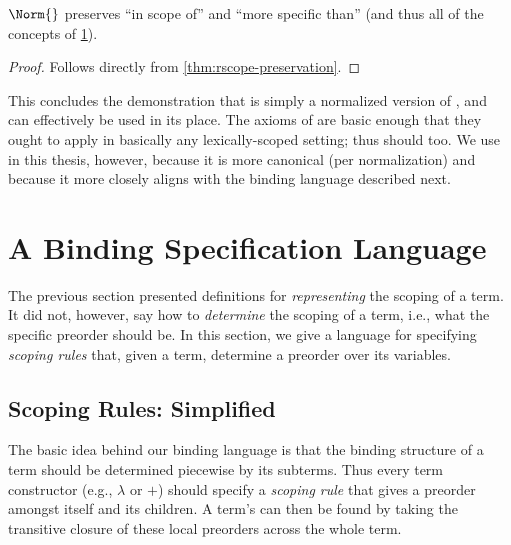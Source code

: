 \begin{lemma}
  $\Norm{}$ preserves ``in scope of'' and ``more specific than''
  (and thus all of the concepts of \cref{sec:rscope-rules}).
\end{lemma}
\begin{proof}
  Follows directly from \cref{thm:rscope-preservation}.
\end{proof}

This concludes the demonstration that {\sap} is simply a normalized
version of {\sas}, and can effectively be used in its place. The
axioms of {\sas} are basic enough that they ought to apply in
basically any lexically-scoped setting; thus {\sap} should too.
We use {\Sap} in this thesis, however, because it is more canonical (per
normalization) and because it more closely aligns with the binding
language described next.



\section{A Binding Specification Language}
\label{sec:rscope-rules}

The previous section presented definitions for \emph{representing} the
scoping of a term. It did not, however, say how to \emph{determine}
the scoping of a term, i.e., what the specific preorder should be. In
this section, we give a language for specifying \emph{scoping rules}
that, given a term, determine a preorder over its variables.

\subsection{Scoping Rules: Simplified}

The basic idea behind our binding language is that the binding structure of
a term should be determined piecewise by its subterms. Thus every term
constructor (e.g., $\lambda$ or $+$) should specify a \emph{scoping rule}
that gives a preorder amongst itself and its children. A term's {\sap}
can then be found by taking the transitive closure of these local
preorders across the whole term.

